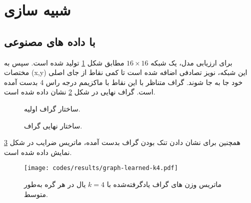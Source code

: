 \documentclass[10pt,twocolumn,a4paper]{article}
\begin{document}
	
	
	\section{شبیه سازی}
	
	
	\subsection{با داده های مصنوعی}
	
	
	برای ارزیابی مدل، یک شبکه $16\times16$  مطابق شکل \ref{fig:graph-initial-1}  تولید شده است. سپس به مختصات (x,y) این شبکه، نویز تصادفی اضافه شده است تا کمی نقاط از جای اصلی خود جا به جا شوند. گراف متناظر با این نقاط با ماکزیمم درجه راس 4
	بدست آمده است. گراف نهایی در شکل
	\ref{fig:graph-final-1}
	نشان داده شده است.
	\begin{figure}[H]
		\centering
		\caption{ساختار گراف اولیه.}
		\label{fig:graph-initial-1}
	\end{figure}
	
	\begin{figure}[H]
		\centering
		\caption{ساختار نهایی گراف.}
		\label{fig:graph-final-1}
	\end{figure}
	همچنین برای نشان دادن تنک بودن
	گراف بدست آمده، ماتریس ضرایب در شکل
	\ref{fig:graph-learned-k4-1}
	نمایش داده شده است.
	
	\begin{figure}[H]
		\centering
		\texttt{[image: codes/results/graph-learned-k4.pdf]}
		\caption{
			ماتریس وزن های گراف یادگرفته‌شده با \( k = 4 \) یال در هر گره به‌طور متوسط.
		}
		\label{fig:graph-learned-k4-1}
	\end{figure}
	
	
\end{document}
